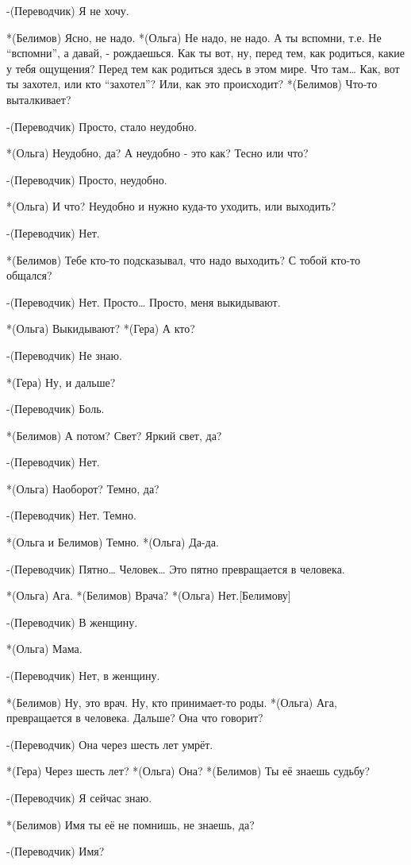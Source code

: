 -(Переводчик) Я не хочу.

*(Белимов) Ясно, не надо.
*(Ольга) Не надо, не надо. А ты вспомни, т.е. Не “вспомни”, а давай, - рождаешься. Как ты вот, ну, перед тем, как родиться, какие у тебя ощущения? Перед тем как родиться здесь в этом мире. Что там… Как, вот ты захотел, или кто “захотел”? Или, как это происходит?
*(Белимов) Что-то выталкивает?

-(Переводчик) Просто, стало неудобно.

*(Ольга) Неудобно, да? А неудобно - это как? Тесно или что?

-(Переводчик) Просто, неудобно.

*(Ольга) И что? Неудобно и нужно куда-то уходить, или выходить?

-(Переводчик) Нет.

*(Белимов) Тебе кто-то подсказывал, что надо выходить? С тобой кто-то общался?

-(Переводчик) Нет. Просто… Просто, меня выкидывают.

*(Ольга) Выкидывают?
*(Гера) А кто?

-(Переводчик) Не знаю.

*(Гера) Ну, и дальше?

-(Переводчик) Боль.

*(Белимов) А потом? Свет? Яркий свет, да?

-(Переводчик) Нет.

*(Ольга) Наоборот?  Темно, да?

-(Переводчик) Нет. Темно.

*(Ольга и Белимов) Темно.
*(Ольга) Да-да.

-(Переводчик) Пятно… Человек… Это пятно превращается в человека.

*(Ольга) Ага.
*(Белимов) Врача?
*(Ольга) Нет.[Белимову]

-(Переводчик) В женщину.

*(Ольга) Мама.

-(Переводчик) Нет, в женщину.

*(Белимов) Ну, это врач. Ну, кто принимает-то роды.
*(Ольга) Ага, превращается в человека. Дальше? Она что говорит?

-(Переводчик) Она через шесть лет умрёт.

*(Гера) Через шесть лет?
*(Ольга) Она?
*(Белимов) Ты её знаешь судьбу? 

-(Переводчик) Я сейчас знаю.

*(Белимов) Имя ты её не помнишь, не знаешь, да?

-(Переводчик) Имя?


